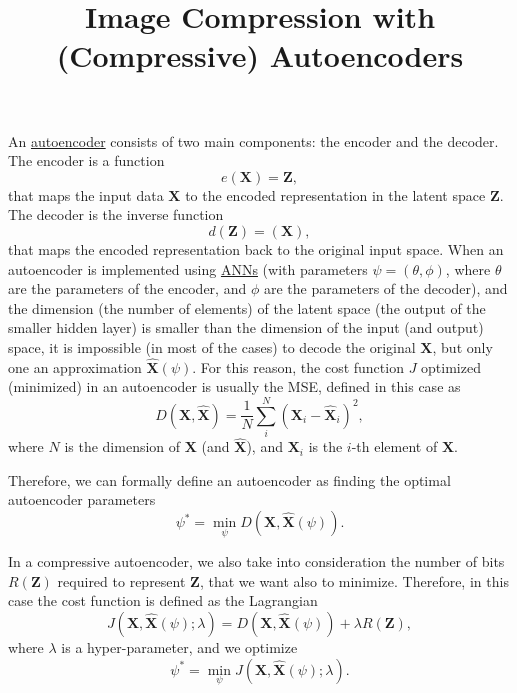 \title{Image Compression with (Compressive) Autoencoders}

\maketitle

An
\href{https://www.lherranz.org/2022/08/24/neural-image-compression-in-a-nutshell-part-1-main-idea/}{autoencoder}
consists of two main components: the encoder and the decoder. The
encoder is a function
\begin{equation}
e(\mathbf{X})=\mathbf{Z},
\end{equation}
that maps the input data $\mathbf{X}$ to the encoded representation in
the latent space $\mathbf{Z}$. The decoder is the inverse function
\begin{equation}
d(\mathbf{Z})=(\mathbf{X}),
\end{equation}
that maps the encoded representation back to the original input
space. When an autoencoder is implemented using
\href{https://en.wikipedia.org/wiki/Artificial_neural_network}{ANNs} (with
parameters $\psi=(\theta,\phi)$, where $\theta$ are the parameters of
the encoder, and $\phi$ are the parameters of the decoder), and the
dimension (the number of elements) of the latent space (the output of
the smaller hidden layer) is smaller than the dimension of the input
(and output) space, it is impossible (in most of the cases) to decode
the original $\mathbf{X}$, but only one an approximation
$\hat{\mathbf{X}}(\psi)$. For this reason, the cost function $J$
optimized (minimized) in an autoencoder is usually the MSE, defined in
this case as
\begin{equation}
D(\mathbf{X}, \hat{\mathbf{X}})=\frac{1}{N}\sum_{i}^{N}(\mathbf{X}_i-\hat{\mathbf{X}}_i)^2,
\end{equation}
where $N$ is the dimension of $\mathbf{X}$ (and $\hat{\mathbf{X}}$),
and $\mathbf{X}_i$ is the $i$-th element of $\mathbf{X}$.

Therefore, we can formally define an autoencoder as finding the
optimal autoencoder parameters
\begin{equation}
\psi^*=\min_\psi D(\mathbf{X}, \hat{\mathbf{X}}(\psi)).
\end{equation}

In a compressive autoencoder, we also take into consideration the
number of bits $R(\mathbf{Z})$ required to represent $\mathbf{Z}$,
that we want also to minimize. Therefore, in this case the cost
function is defined as the Lagrangian
\begin{equation}
J(\mathbf{X}, \hat{\mathbf{X}}(\psi); \lambda)=D(\mathbf{X}, \hat{\mathbf{X}}(\psi)) + \lambda R(\mathbf{Z}),
\end{equation}
where $\lambda$ is a hyper-parameter, and we optimize
\begin{equation}
\psi^*=\min_\psi J(\mathbf{X}, \hat{\mathbf{X}}(\psi); \lambda).
\end{equation}

